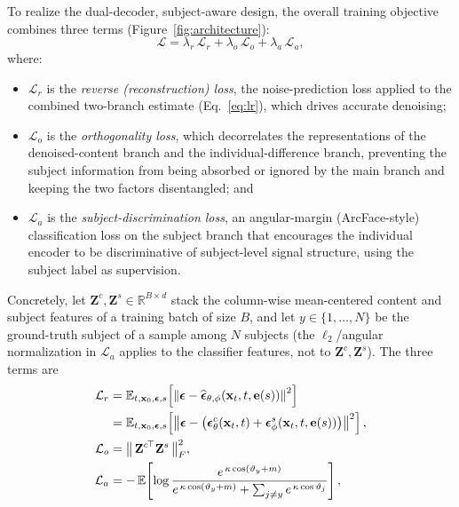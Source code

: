 To realize the dual-decoder, subject-aware design, the overall training
objective combines three terms (Figure~\ref{fig:architecture}):
\begin{equation}
  \mathcal{L}=\lambda_r\,\mathcal{L}_r+\lambda_o\,\mathcal{L}_o+\lambda_a\,\mathcal{L}_a,
  \label{eq:total_loss}
\end{equation}
where:
\begin{itemize}
  \item $\mathcal{L}_r$ is the \emph{reverse (reconstruction) loss}, the
  noise-prediction loss applied to the combined two-branch estimate
  (Eq.~\eqref{eq:lr}), which drives accurate denoising;
  \item $\mathcal{L}_o$ is the \emph{orthogonality loss}, which decorrelates the
  representations of the denoised-content branch and the individual-difference
  branch, preventing the subject information from being absorbed or ignored by
  the main branch and keeping the two factors disentangled; and
  \item $\mathcal{L}_a$ is the \emph{subject-discrimination loss}, an
  angular-margin (ArcFace-style) classification loss on the subject branch that
  encourages the individual encoder to be discriminative of subject-level signal structure,
  using the subject label as supervision.
\end{itemize}
Concretely, let $\mathbf{Z}^{c},\mathbf{Z}^{s}\in\mathbb{R}^{B\times d}$ stack
the column-wise mean-centered content and subject features of a training batch of
size $B$, and let $y\in\{1,\dots,N\}$ be the ground-truth subject of a sample
among $N$ subjects (the $\ell_2$/angular normalization in $\mathcal{L}_a$ applies
to the classifier features, not to $\mathbf{Z}^{c},\mathbf{Z}^{s}$). The three terms are
\begin{align}
  \mathcal{L}_r
  &= \mathbb{E}_{t,\mathbf{x}_0,\boldsymbol{\epsilon},s}\!\left[
  \left\|\boldsymbol{\epsilon}-
  \widehat{\boldsymbol{\epsilon}}_{\theta,\phi}(\mathbf{x}_t,t,\mathbf{e}(s))
  \right\|^{2}\right] \notag\\
  &= \mathbb{E}_{t,\mathbf{x}_0,\boldsymbol{\epsilon},s}\!\left[
  \left\|\boldsymbol{\epsilon}-
  \left(
  \boldsymbol{\epsilon}^{c}_{\theta}(\mathbf{x}_t,t)
  +
  \boldsymbol{\epsilon}^{s}_{\phi}(\mathbf{x}_t,t,\mathbf{e}(s))
  \right)
  \right\|^{2}\right],\label{eq:lr}\\
  \mathcal{L}_o &= \big\|\,{\mathbf{Z}^{c}}^{\!\top}\mathbf{Z}^{s}\,\big\|_F^{2},\label{eq:lo}\\
  \mathcal{L}_a &= -\,\mathbb{E}\!\left[\log\frac{e^{\,\kappa\cos(\vartheta_{y}+m)}}{e^{\,\kappa\cos(\vartheta_{y}+m)}+\sum_{j\neq y}e^{\,\kappa\cos\vartheta_{j}}}\right],\label{eq:la}
\end{align}
